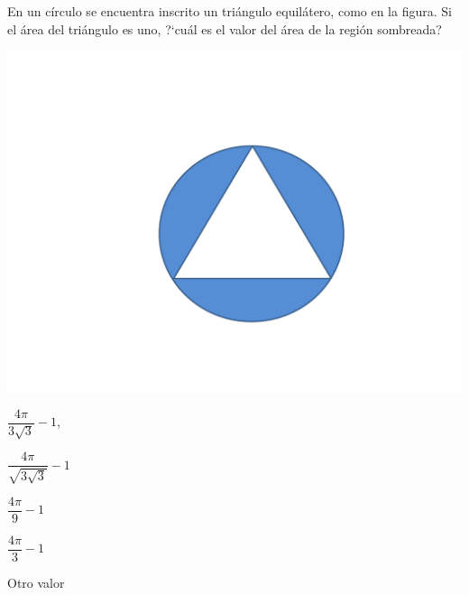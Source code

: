 \begin{Solucion}
  
\end{Solucion}

\begin{Problema}{6}
  En un c\'irculo se encuentra inscrito un tri\'angulo equil\'atero, como en la figura. 
  Si el \'area del tri\'angulo es uno, ?`cu\'al es el valor del \'area de la regi\'on 
  sombreada?

  \begin{center}
    \includegraphics[scale=0.20]{critri.pdf}
  \end{center}

  \begin{inparaenum}
  \item $\dfrac{4\pi}{3\sqrt{3}}-1$, \quad\qquad
  \item $\dfrac{4\pi}{\sqrt{3\sqrt{3}}}-1$ \quad\qquad
  \item $\dfrac{4\pi}{9}-1$ \quad\qquad
  \item $\dfrac{4\pi}{3}-1$ \quad\qquad 
  \item Otro valor
  \end{inparaenum}
\end{Problema}

\begin{Solucion}
  
\end{Solucion}

